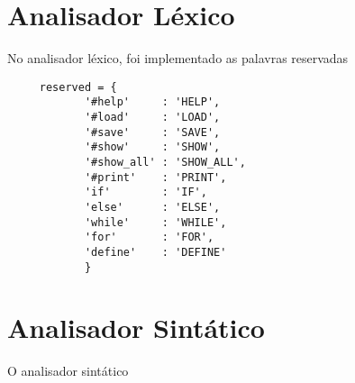 \documentclass[12pt]{article}
\begin{document}
\section{Analisador Léxico}

No analisador léxico, foi implementado as palavras reservadas

\begin{verbatim}
     reserved = {
            '#help'     : 'HELP',
            '#load'     : 'LOAD',
            '#save'     : 'SAVE',
            '#show'     : 'SHOW',
            '#show_all' : 'SHOW_ALL',
            '#print'    : 'PRINT',
            'if'        : 'IF',
            'else'      : 'ELSE',
            'while'     : 'WHILE',
            'for'       : 'FOR',
            'define'    : 'DEFINE'
            }
\end{verbatim}



\section{Analisador Sintático}

O analisador sintático 
\end{document}
